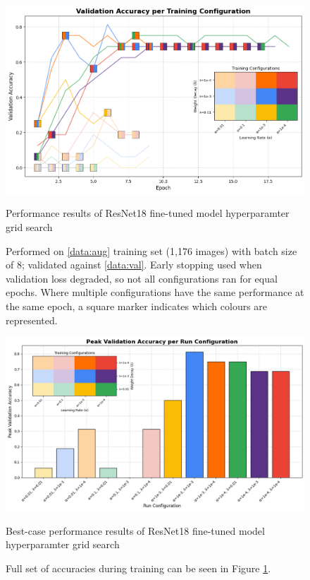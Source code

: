             \begin{figure}[h]
                \centering
                \includegraphics[width=\textwidth]{images/ResNetCNN_AugGrid.png}
                \caption{Performance results of ResNet18 fine-tuned model hyperparamter grid search}
                \caption*{Performed on \ref{data:aug} training set (1,176 images) with batch size of 8; validated against \ref{data:val}. Early stopping used when validation loss degraded, so not all configurations ran for equal epochs. Where multiple configurations have the same performance at the same epoch, a square marker indicates which colours are represented.}
                \label{fig:ResNet_AugGrid}
            \end{figure}
    
            \begin{figure}[h]
                \centering
                \includegraphics[width=\textwidth]{images/ResNetCNN_AugGridHist.png}
                \caption{Best-case performance results of ResNet18 fine-tuned model hyperparamter grid search}
                \caption*{
                    Full set of accuracies during training can be seen in Figure \ref{fig:ResNet_AugGrid}.
                }
                \label{fig:ResNet_AugGridHist}
            \end{figure}
    
